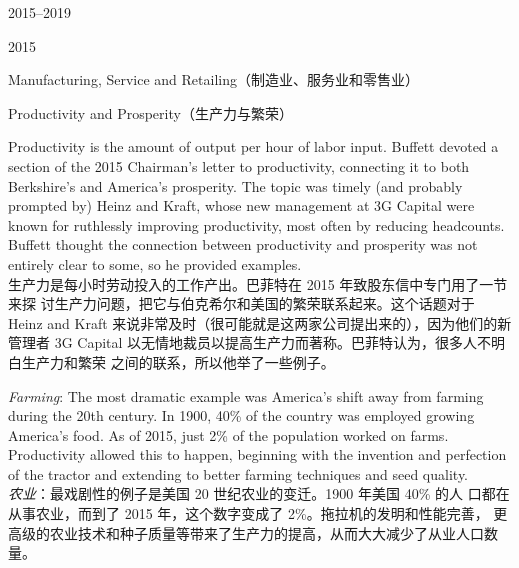 \begin{chapter}{2015--2019}
\begin{section}{2015}
\begin{subsection}{Manufacturing, Service and Retailing（制造业、服务业和零售业）}
\end{subsection}

\begin{subsection}{Productivity and Prosperity（生产力与繁荣）}
\begin{verseparallel}
  {
    Productivity is the amount of output per hour of labor input. Buffett
    devoted a section of the 2015 Chairman's letter to productivity, connecting
    it to both Berkshire's and America's prosperity. The topic was timely (and
    probably prompted by) Heinz and Kraft, whose new management at 3G Capital
    were known for ruthlessly improving productivity, most often by reducing
    headcounts. Buffett thought the connection between productivity and
    prosperity was not entirely clear to some, so he provided examples. \\
  }
  {
    生产力是每小时劳动投入的工作产出。巴菲特在 2015 年致股东信中专门用了一节来探
    讨生产力问题，把它与伯克希尔和美国的繁荣联系起来。这个话题对于 Heinz and
    Kraft 来说非常及时（很可能就是这两家公司提出来的），因为他们的新管理者 3G
    Capital 以无情地裁员以提高生产力而著称。巴菲特认为，很多人不明白生产力和繁荣
    之间的联系，所以他举了一些例子。
  }
\end{verseparallel}

{\color{green}{此处应为列表项 \\}}

\begin{verseparallel}
  {
    \textit{Farming}: The most dramatic example was America's shift away
    from farming during the 20th century. In 1900, 40\% of the country
    was employed growing America's food. As of 2015, just 2\% of the
    population worked on farms. Productivity allowed this to happen,
    beginning with the invention and perfection of the tractor and
    extending to better farming techniques and seed quality. \\
  }
  {
    \textit{农业}：最戏剧性的例子是美国 20 世纪农业的变迁。1900 年美国 40\% 的人
    口都在从事农业，而到了 2015 年，这个数字变成了 2\%。拖拉机的发明和性能完善，
    更高级的农业技术和种子质量等带来了生产力的提高，从而大大减少了从业人口数量。
  }
\end{verseparallel}


\end{subsection}
\end{section}
\end{chapter}
